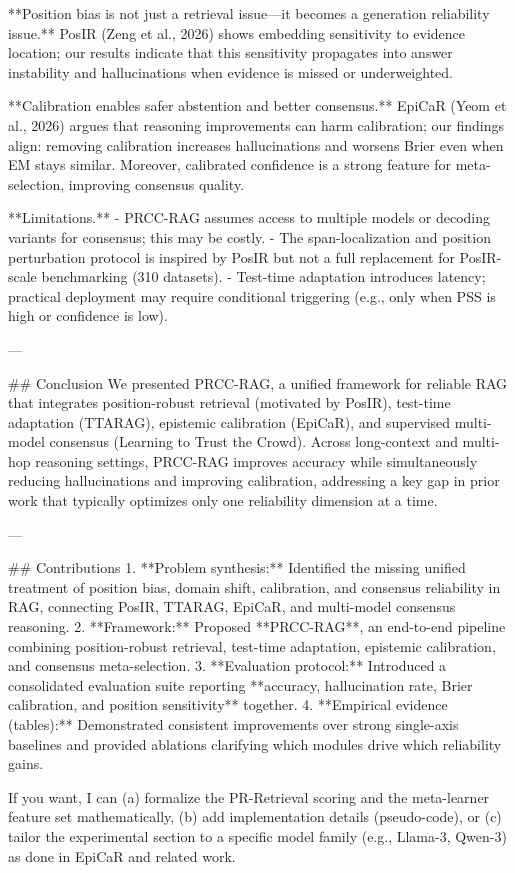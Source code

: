 **Position bias is not just a retrieval issue—it becomes a generation reliability issue.** PosIR (Zeng et al., 2026) shows embedding sensitivity to evidence location; our results indicate that this sensitivity propagates into answer instability and hallucinations when evidence is missed or underweighted.

**Calibration enables safer abstention and better consensus.** EpiCaR (Yeom et al., 2026) argues that reasoning improvements can harm calibration; our findings align: removing calibration increases hallucinations and worsens Brier even when EM stays similar. Moreover, calibrated confidence is a strong feature for meta-selection, improving consensus quality.

**Limitations.**  
- PRCC-RAG assumes access to multiple models or decoding variants for consensus; this may be costly.  
- The span-localization and position perturbation protocol is inspired by PosIR but not a full replacement for PosIR-scale benchmarking (310 datasets).  
- Test-time adaptation introduces latency; practical deployment may require conditional triggering (e.g., only when PSS is high or confidence is low).

---

## Conclusion  
We presented PRCC-RAG, a unified framework for reliable RAG that integrates position-robust retrieval (motivated by PosIR), test-time adaptation (TTARAG), epistemic calibration (EpiCaR), and supervised multi-model consensus (Learning to Trust the Crowd). Across long-context and multi-hop reasoning settings, PRCC-RAG improves accuracy while simultaneously reducing hallucinations and improving calibration, addressing a key gap in prior work that typically optimizes only one reliability dimension at a time.

---

## Contributions  
1. **Problem synthesis:** Identified the missing unified treatment of position bias, domain shift, calibration, and consensus reliability in RAG, connecting PosIR, TTARAG, EpiCaR, and multi-model consensus reasoning.  
2. **Framework:** Proposed **PRCC-RAG**, an end-to-end pipeline combining position-robust retrieval, test-time adaptation, epistemic calibration, and consensus meta-selection.  
3. **Evaluation protocol:** Introduced a consolidated evaluation suite reporting **accuracy, hallucination rate, Brier calibration, and position sensitivity** together.  
4. **Empirical evidence (tables):** Demonstrated consistent improvements over strong single-axis baselines and provided ablations clarifying which modules drive which reliability gains.

If you want, I can (a) formalize the PR-Retrieval scoring and the meta-learner feature set mathematically, (b) add implementation details (pseudo-code), or (c) tailor the experimental section to a specific model family (e.g., Llama-3, Qwen-3) as done in EpiCaR and related work.